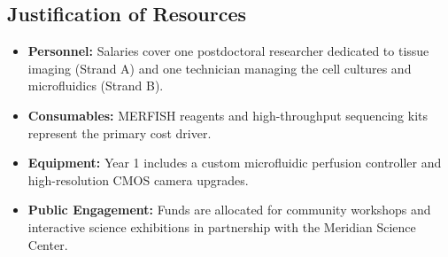\subsection{Justification of Resources}
\begin{itemize}
    \item \textbf{Personnel:} Salaries cover one postdoctoral researcher dedicated to tissue imaging (Strand A) and one technician managing the cell cultures and microfluidics (Strand B).
    \item \textbf{Consumables:} MERFISH reagents and high-throughput sequencing kits represent the primary cost driver.
    \item \textbf{Equipment:} Year 1 includes a custom microfluidic perfusion controller and high-resolution CMOS camera upgrades.
    \item \textbf{Public Engagement:} Funds are allocated for community workshops and interactive science exhibitions in partnership with the Meridian Science Center.
\end{itemize}
